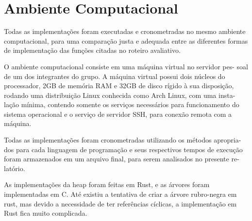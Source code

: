 \section{Ambiente Computacional}

Todas as implementações foram executadas e cronometradas no 
mesmo ambiente computacional, para uma comparação justa e 
adequada entre as diferentes formas de implementação das 
funções citadas no roteiro avaliativo.

O ambiente computacional consiste em uma máquina virtual no servidor pes-
soal de um dos integrantes do grupo. A máquina virtual possui dois núcleos do
processador, 2GB de memória RAM e 32GB de disco rígido à sua disposição,
rodando uma distribuição Linux conhecida como Arch Linux, com uma insta-
lação mínima, contendo somente os serviços necessários para funcionamento do
sistema operacional e o serviço de servidor SSH, para conexão remota com a
máquina.

Todas as implementações foram cronometradas utilizando os métodos apropria-
dos para cada linguagem de programação e seus respectivos tempos de execução
foram armazenados em um arquivo final, para serem analisados no presente re-
latório.

As implementações da heap foram feitas em Rust, e as árvores foram implementadas em C.
Até existiu a tentativa de criar a árvore rubro-negra em rust, mas devido a necessidade
de ter referências cíclicas, a implementação em Rust fica muito complicada.

